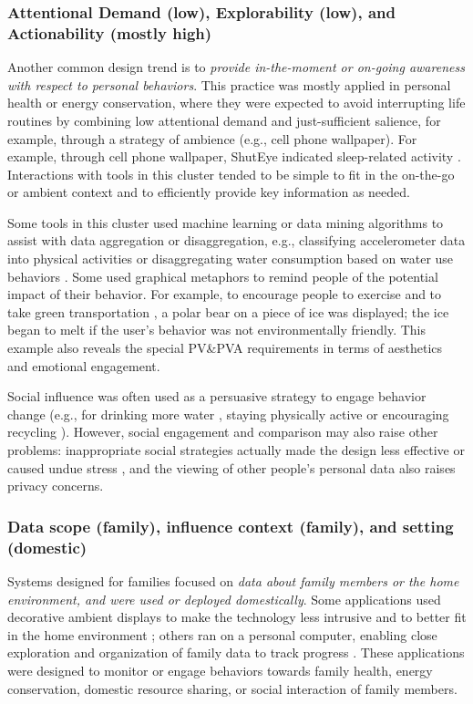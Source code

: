 \documentclass[12pt,oneside]{book}
\begin{document}
\subsubsection{Attentional Demand (low), Explorability (low), and Actionability (mostly high)}
Another common design trend is to \textit{provide in-the-moment or on-going awareness with respect to personal behaviors}.
This practice was mostly applied in personal health or energy conservation, where they were expected to avoid interrupting life routines by combining low attentional demand and just-sufficient salience, for example, through a strategy of ambience (e.g., cell phone wallpaper).  For example, through cell phone wallpaper, ShutEye indicated sleep-related activity \cite{bauer_shuteye:_2012}. Interactions with tools in this cluster tended to be simple to fit in the on-the-go or ambient context and to efficiently provide key information as needed. 

Some tools in this cluster used machine learning or data mining algorithms to assist with data aggregation or disaggregation, e.g., classifying accelerometer data into physical activities \cite{consolvo_activity_2008} or disaggregating water consumption based on water use behaviors \cite{froehlich_design_2012}.  Some used graphical metaphors to remind people of the potential impact of their behavior. For example, to encourage people to exercise and to take green transportation \cite{froehlich_ubigreen:_2009}, a polar bear on a piece of ice was displayed; the ice began to melt if the user's behavior was not environmentally friendly.  This example also reveals the special PV\&PVA requirements in terms of aesthetics and emotional engagement.

Social influence was often used as a persuasive strategy to engage behavior change (e.g., for drinking more water \cite{chiu_playful_2009}, staying physically active \cite{lin_fishnsteps:_2006} or encouraging recycling \cite{thieme_weve_2012}).  However, social engagement and comparison may also raise other problems: inappropriate social strategies actually made the design less effective or caused undue stress \cite{thieme_weve_2012}, and the viewing of other people's personal data also raises privacy concerns.
 
\subsubsection{Data scope (family), influence context (family), and setting (domestic)}
Systems designed for families focused on \textit{data about family members or the home environment, and were used or deployed domestically}.
Some applications used decorative ambient displays to make the technology less intrusive and to better fit in the home environment \cite{froehlich_design_2012}; others ran on a personal computer, enabling close exploration and organization of family data to track progress \cite{kientz_baby_2009}.  These applications were designed to monitor or engage behaviors towards family health, energy conservation, domestic resource sharing, or social interaction of family members. 
\end{document}
